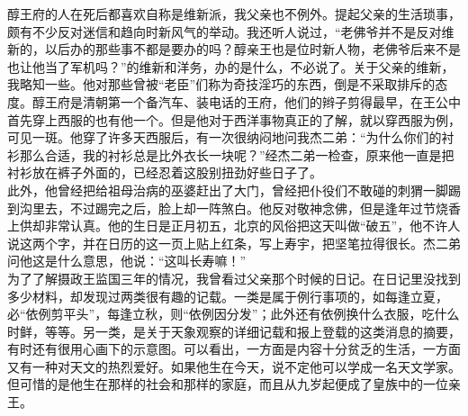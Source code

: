 醇王府的人在死后都喜欢自称是维新派，我父亲也不例外。提起父亲的生活琐事，颇有不少反对迷信和趋向时新风气的举动。我还听人说过，“老佛爷并不是反对维新的，以后办的那些事不都是要办的吗？醇亲王也是位时新人物，老佛爷后来不是也让他当了军机吗？”的维新和洋务，办的是什么，不必说了。关于父亲的维新，我略知一些。他对那些曾被“老臣”们称为奇技淫巧的东西，倒是不采取排斥的态度。醇王府是清朝第一个备汽车、装电话的王府，他们的辫子剪得最早，在王公中首先穿上西服的也有他一个。但是他对于西洋事物真正的了解，就以穿西服为例，可见一斑。他穿了许多天西服后，有一次很纳闷地问我杰二弟：“为什么你们的衬衫那么合适，我的衬衫总是比外衣长一块呢？”经杰二弟一检查，原来他一直是把衬衫放在裤子外面的，已经忍着这股别扭劲好些日子了。\\

此外，他曾经把给祖母治病的巫婆赶出了大门，曾经把仆役们不敢碰的刺猬一脚踢到沟里去，不过踢完之后，脸上却一阵煞白。他反对敬神念佛，但是逢年过节烧香上供却非常认真。他的生日是正月初五，北京的风俗把这天叫做“破五”，他不许人说这两个字，并在日历的这一页上贴上红条，写上寿宇，把坚笔拉得很长。杰二弟问他这是什么意思，他说：“这叫长寿嘛！”\\

为了了解摄政王监国三年的情况，我曾看过父亲那个时候的日记。在日记里没找到多少材料，却发现过两类很有趣的记载。一类是属于例行事项的，如每逢立夏，必“依例剪平头”，每逢立秋，则“依例因分发”；此外还有依例换什么衣服，吃什么时鲜，等等。另一类，是关于天象观察的详细记载和报上登载的这类消息的摘要，有时还有很用心画下的示意图。可以看出，一方面是内容十分贫乏的生活，一方面又有一种对天文的热烈爱好。如果他生在今天，说不定他可以学成一名天文学家。但可惜的是他生在那样的社会和那样的家庭，而且从九岁起便成了皇族中的一位亲王。
